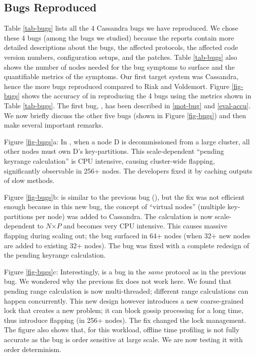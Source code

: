
\subsection{Bugs Reproduced}
\label{eval-bugs}

Table \ref{tab-bugs} lists all the 4 Cassandra bugs we have reproduced. We
chose these 4 bugs (among the \numStudy bugs we studied) because the reports
contain more detailed descriptions about the bugs, the affected protocols, the
affected code version numbers, configuration setups, and the patches. Table
\ref{tab-bugs} also shows the number of nodes needed for the bug symptoms to
surface and the quantifiable metrics of the symptoms.
%
Our first target system was Cassandra, hence the more bugs reproduced compared
to Riak and Voldemort.
%
Figure \ref{fig-bugs} shows the accuracy of \sck in reproducing the 4 bugs using
the metrics shown in Table \ref{tab-bugs}.
%
The first bug, \caone, has been described in \sec\ref{mot-bug} and
\sec\ref{eval-accu}.
%
We now briefly discuss the other five bugs (shown in Figure \ref{fig-bugs}) and
then
%
make several important remarks.


Figure \ref{fig-bugs}a: In \catwo \cite{CA-Two}, 
when a node D is decommissioned from a
large cluster, all other nodes must own D's key-partitions.
This scale-dependent ``pending keyrange calculation'' is CPU intensive,
causing cluster-wide flapping, significantly observable in 256+ nodes.
The developers fixed it by caching outputs of slow methods.

Figure \ref{fig-bugs}b: \catri \cite{CA-Tri} 
is similar to the previous bug (\catwo),
but the fix was not efficient enough because in this new bug, the concept
of ``virtual nodes'' (multiple key-partitions per node) was added to
Cassandra.  The calculation is now scale-dependent to $N$$\times$$P$ and
becomes very CPU intensive.  This causes massive flapping during scaling out; 
the bug surfaced in 64+ nodes (when 32+ new nodes are added
to existing 32+ nodes). The bug was fixed with a complete 
redesign of the pending keyrange calculation.
%



Figure \ref{fig-bugs}c: Interestingly, \cafour \cite{CA-Four} is 
a bug in the {\em same}
protocol as in the previous bug.  We wondered why the previous fix does
not work here.  We found that pending range calculation is now
multi-threaded; different range calculations can happen concurrently.
This new design however introduces a new coarse-grained lock that creates
a new problem;  it can block gossip processing for a long
time, thus introduce flapping (in 256+ nodes).  The fix changed the
lock management.
%
The figure also shows that, for this workload, offline time profiling
is not fully accurate as the bug is order sensitive at large scale.
We are now testing it with order determinism. 


